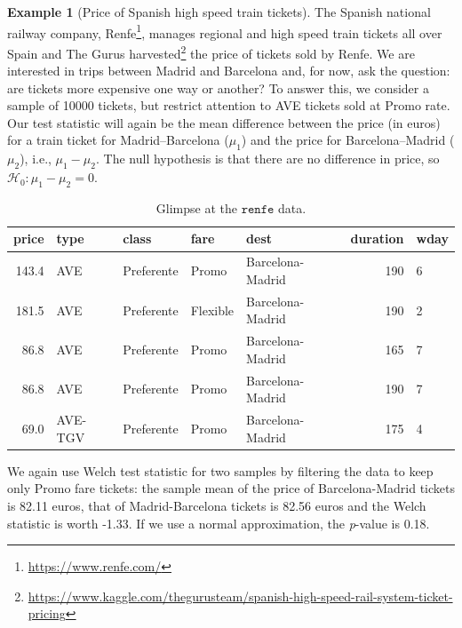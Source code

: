 \documentclass[
  11pt,
  letterpaper,
]{book}
\renewcommand{\href}[2]{#2\footnote{\url{#1}}}
\theoremstyle{definition}
\theoremstyle{definition}
\newtheorem{example}{Example}[chapter]
\theoremstyle{definition}
\theoremstyle{definition}
\theoremstyle{remark}
\begin{document}
\begin{example}[Price of Spanish high speed train tickets]
\protect\hypertarget{exm:price-trains-tests}{}{\label{exm:price-trains-tests} {} }The Spanish national railway company, \href{https://www.renfe.com/}{Renfe}, manages regional and high speed train tickets all over Spain and The Gurus \href{https://www.kaggle.com/thegurusteam/spanish-high-speed-rail-system-ticket-pricing}{harvested} the price of tickets sold by Renfe. We are interested in trips between Madrid and Barcelona and, for now, ask the question: are tickets more expensive one way or another? To answer this, we consider a sample of 10000 tickets, but restrict attention to AVE tickets sold at Promo rate. Our test statistic will again be the mean difference between the price (in euros) for a train ticket for Madrid--Barcelona (\(\mu_1\)) and the price for Barcelona--Madrid (\(\mu_2\)), i.e., \(\mu_1-\mu_2\). The null hypothesis is that there are no difference in price, so \(\mathscr{H}_0: \mu_1-\mu_2=0\).
\end{example}

\begin{table}

\caption{\label{tab:renfetest}Glimpse at the $\texttt{renfe}$ data.}
\centering
\begin{tabular}[t]{rllllrl}
\toprule
price & type & class & fare & dest & duration & wday\\
\midrule
143.4 & AVE & Preferente & Promo & Barcelona-Madrid & 190 & 6\\
181.5 & AVE & Preferente & Flexible & Barcelona-Madrid & 190 & 2\\
86.8 & AVE & Preferente & Promo & Barcelona-Madrid & 165 & 7\\
86.8 & AVE & Preferente & Promo & Barcelona-Madrid & 190 & 7\\
69.0 & AVE-TGV & Preferente & Promo & Barcelona-Madrid & 175 & 4\\
\bottomrule
\end{tabular}
\end{table}

We again use Welch test statistic for two samples by filtering the data to keep only Promo fare tickets: the sample mean of the price of Barcelona-Madrid tickets is 82.11 euros, that of Madrid-Barcelona tickets is 82.56 euros and the Welch statistic is worth -1.33. If we use a normal approximation, the \emph{p}-value is 0.18.
\end{document}
